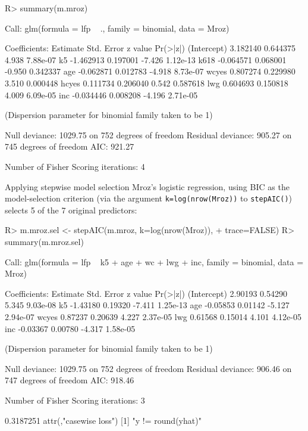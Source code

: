 \documentclass[
]{jss}
\begin{document}
\begin{CodeChunk}
\begin{CodeInput}
R> summary(m.mroz)
\end{CodeInput}
\begin{CodeOutput}

Call:
glm(formula = lfp ~ ., family = binomial, data = Mroz)

Coefficients:
             Estimate Std. Error z value Pr(>|z|)
(Intercept)  3.182140   0.644375   4.938 7.88e-07
k5          -1.462913   0.197001  -7.426 1.12e-13
k618        -0.064571   0.068001  -0.950 0.342337
age         -0.062871   0.012783  -4.918 8.73e-07
wcyes        0.807274   0.229980   3.510 0.000448
hcyes        0.111734   0.206040   0.542 0.587618
lwg          0.604693   0.150818   4.009 6.09e-05
inc         -0.034446   0.008208  -4.196 2.71e-05

(Dispersion parameter for binomial family taken to be 1)

    Null deviance: 1029.75  on 752  degrees of freedom
Residual deviance:  905.27  on 745  degrees of freedom
AIC: 921.27

Number of Fisher Scoring iterations: 4
\end{CodeOutput}
\end{CodeChunk}

Applying stepwise model selection Mroz's logistic regression, using BIC
as the model-selection criterion (via the argument
\texttt{k=log(nrow(Mroz))} to \texttt{stepAIC()}) selects 5 of the 7
original predictors:

\begin{CodeChunk}
\begin{CodeInput}
R> m.mroz.sel <- stepAIC(m.mroz, k=log(nrow(Mroz)),
+                       trace=FALSE)
R> summary(m.mroz.sel)
\end{CodeInput}
\begin{CodeOutput}

Call:
glm(formula = lfp ~ k5 + age + wc + lwg + inc, family = binomial, 
    data = Mroz)

Coefficients:
            Estimate Std. Error z value Pr(>|z|)
(Intercept)  2.90193    0.54290   5.345 9.03e-08
k5          -1.43180    0.19320  -7.411 1.25e-13
age         -0.05853    0.01142  -5.127 2.94e-07
wcyes        0.87237    0.20639   4.227 2.37e-05
lwg          0.61568    0.15014   4.101 4.12e-05
inc         -0.03367    0.00780  -4.317 1.58e-05

(Dispersion parameter for binomial family taken to be 1)

    Null deviance: 1029.75  on 752  degrees of freedom
Residual deviance:  906.46  on 747  degrees of freedom
AIC: 918.46

Number of Fisher Scoring iterations: 3
\end{CodeOutput}
\begin{CodeOutput}
[1] 0.3187251
attr(,"casewise loss")
[1] "y != round(yhat)"
\end{CodeOutput}
\end{CodeChunk}
\end{document}
